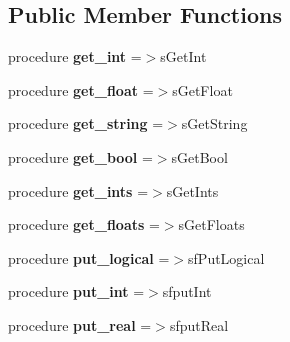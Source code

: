 \subsection*{Public Member Functions}
\begin{DoxyCompactItemize}
\item 
\mbox{\label{structc__regfile__mod_1_1cfile_ad0112c8dfc6d6bace48dfcb7fd589273}} 
procedure {\bfseries get\+\_\+int} =$>$s\+Get\+Int
\item 
\mbox{\label{structc__regfile__mod_1_1cfile_a4ed00eeb21e767c27fd6c111e1292583}} 
procedure {\bfseries get\+\_\+float} =$>$s\+Get\+Float
\item 
\mbox{\label{structc__regfile__mod_1_1cfile_acfc24f518c76ba4502904bbafe3b6810}} 
procedure {\bfseries get\+\_\+string} =$>$s\+Get\+String
\item 
\mbox{\label{structc__regfile__mod_1_1cfile_a2b6f9214890b7d0b0a68b47e78777f8f}} 
procedure {\bfseries get\+\_\+bool} =$>$s\+Get\+Bool
\item 
\mbox{\label{structc__regfile__mod_1_1cfile_ae4e5523761f2459c8840eaa25ae8953b}} 
procedure {\bfseries get\+\_\+ints} =$>$s\+Get\+Ints
\item 
\mbox{\label{structc__regfile__mod_1_1cfile_a38e27267562c3103c9f7bbe0a83e6c98}} 
procedure {\bfseries get\+\_\+floats} =$>$s\+Get\+Floats
\item 
\mbox{\label{structc__regfile__mod_1_1cfile_af5bb28e6a4948068eb0c720a1923f1da}} 
procedure {\bfseries put\+\_\+logical} =$>$sf\+Put\+Logical
\item 
\mbox{\label{structc__regfile__mod_1_1cfile_adde845d94425f3456f4d95d8adf4802a}} 
procedure {\bfseries put\+\_\+int} =$>$sfput\+Int
\item 
\mbox{\label{structc__regfile__mod_1_1cfile_afdb245119aad6b18c077e059d0b8e96b}} 
procedure {\bfseries put\+\_\+real} =$>$sfput\+Real

\end{DoxyCompactItemize}
